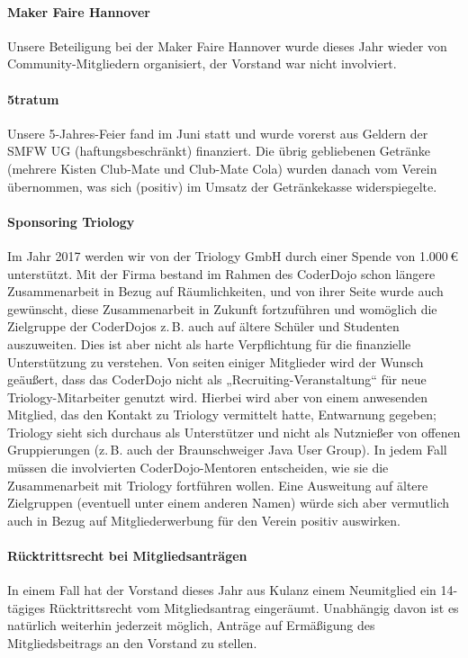 \documentclass[parskip=half-]{s0minutes}
\begin{document}
\paragraph{Maker Faire Hannover} Unsere Beteiligung bei der Maker Faire Hannover
wurde dieses Jahr wieder von Community-Mitgliedern organisiert, der Vorstand war
nicht involviert.

\paragraph{5tratum}
Unsere 5-Jahres-Feier fand im Juni statt und wurde vorerst aus Geldern
der SMFW UG (haftungsbeschränkt) finanziert. Die übrig gebliebenen Getränke
(mehrere Kisten Club-Mate und Club-Mate Cola) wurden danach vom Verein
übernommen, was sich (positiv) im Umsatz der Getränkekasse widerspiegelte.

\paragraph{Sponsoring Triology}
Im Jahr 2017 werden wir von der Triology GmbH durch einer Spende von 1{.}000\,€
unterstützt. Mit der Firma bestand im Rahmen des CoderDojo schon längere
Zusammenarbeit in Bezug auf Räumlichkeiten, und von ihrer Seite wurde auch
gewünscht, diese Zusammenarbeit in Zukunft fortzuführen und womöglich die
Zielgruppe der CoderDojos z.\,B. auch auf ältere Schüler und Studenten
auszuweiten. Dies ist aber nicht als harte Verpflichtung für die finanzielle
Unterstützung zu verstehen. Von seiten einiger Mitglieder wird der Wunsch
geäußert, dass das CoderDojo nicht als „Recruiting-Veranstaltung“ für neue
Triology-Mitarbeiter genutzt wird. Hierbei wird aber von einem anwesenden
Mitglied, das den Kontakt zu Triology vermittelt hatte, Entwarnung gegeben;
Triology sieht sich durchaus als Unterstützer und nicht als Nutznießer von
offenen Gruppierungen (z.\,B. auch der Braunschweiger Java User Group). In jedem
Fall müssen die involvierten CoderDojo-Mentoren entscheiden, wie sie die
Zusammenarbeit mit Triology fortführen wollen. Eine Ausweitung auf ältere
Zielgruppen (eventuell unter einem anderen Namen) würde sich aber vermutlich
auch in Bezug auf Mitgliederwerbung für den Verein positiv auswirken.

\paragraph{Rücktrittsrecht bei Mitgliedsanträgen}
In einem Fall hat der Vorstand dieses Jahr aus Kulanz einem Neumitglied ein
14-tägiges Rücktrittsrecht vom Mitgliedsantrag eingeräumt. Unabhängig davon ist
es natürlich weiterhin jederzeit möglich, Anträge auf Ermäßigung des
Mitgliedsbeitrags an den Vorstand zu stellen.
\end{document}
